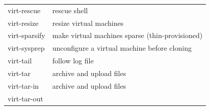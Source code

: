 \documentclass[
  14pt,
  english,
  a4paper,
]{scrreprt}
\begin{document}
\begin{longtable}[]{@{}ll@{}}
\begin{minipage}[t]{0.33\columnwidth}
virt-rescue\strut
\end{minipage} & \begin{minipage}[t]{0.61\columnwidth}\raggedright
rescue shell\strut
\end{minipage}\tabularnewline
\begin{minipage}[t]{0.33\columnwidth}\raggedright
virt-resize\strut
\end{minipage} & \begin{minipage}[t]{0.61\columnwidth}\raggedright
resize virtual machines\strut
\end{minipage}\tabularnewline
\begin{minipage}[t]{0.33\columnwidth}\raggedright
virt-sparsify\strut
\end{minipage} & \begin{minipage}[t]{0.61\columnwidth}\raggedright
make virtual machines sparse (thin-provisioned)\strut
\end{minipage}\tabularnewline
\begin{minipage}[t]{0.33\columnwidth}\raggedright
virt-sysprep\strut
\end{minipage} & \begin{minipage}[t]{0.61\columnwidth}\raggedright
unconfigure a virtual machine before cloning\strut
\end{minipage}\tabularnewline
\begin{minipage}[t]{0.33\columnwidth}\raggedright
virt-tail\strut
\end{minipage} & \begin{minipage}[t]{0.61\columnwidth}\raggedright
follow log file\strut
\end{minipage}\tabularnewline
\begin{minipage}[t]{0.33\columnwidth}\raggedright
virt-tar\strut
\end{minipage} & \begin{minipage}[t]{0.61\columnwidth}\raggedright
archive and upload files\strut
\end{minipage}\tabularnewline
\begin{minipage}[t]{0.33\columnwidth}\raggedright
virt-tar-in\strut
\end{minipage} & \begin{minipage}[t]{0.61\columnwidth}\raggedright
archive and upload files\strut
\end{minipage}\tabularnewline
\begin{minipage}[t]{0.33\columnwidth}\raggedright
virt-tar-out\strut
\end{minipage} & \begin{minipage}[t]{0.61\columnwidth}\raggedright

\end{minipage}
\end{longtable}
\end{document}
